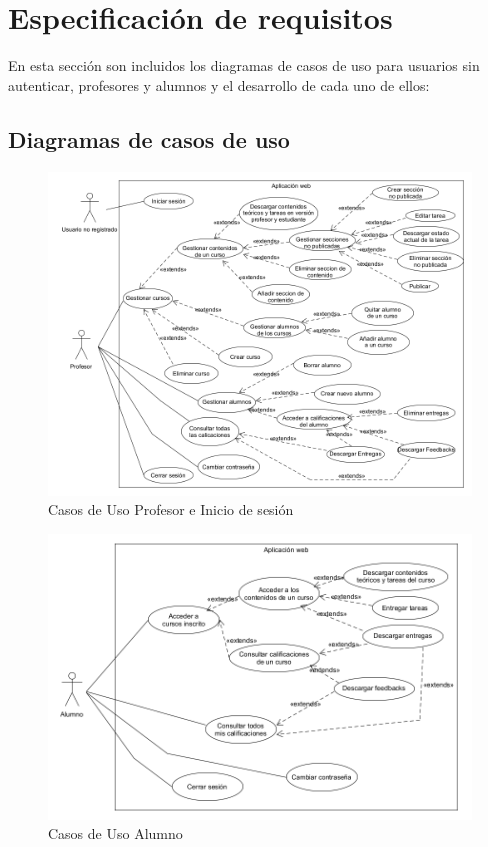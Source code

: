 \newpage
\section{Especificación de requisitos}

En esta sección son incluidos los diagramas de casos de uso para usuarios sin autenticar, profesores y alumnos y el desarrollo de cada uno de ellos:

\subsection{Diagramas de casos de uso}
\begin{figure}[H]
    \centering
    \includegraphics[width=\textwidth]{img/imgs-memoria/CasosDeUso_Profesor.png}
    \caption{Casos de Uso Profesor e Inicio de sesión}
\end{figure}

\begin{figure}[H]
    \centering
    \includegraphics[width=\textwidth]{img/imgs-memoria/CasosDeUso_Alumno.png}
    \caption{Casos de Uso Alumno}
\end{figure}


